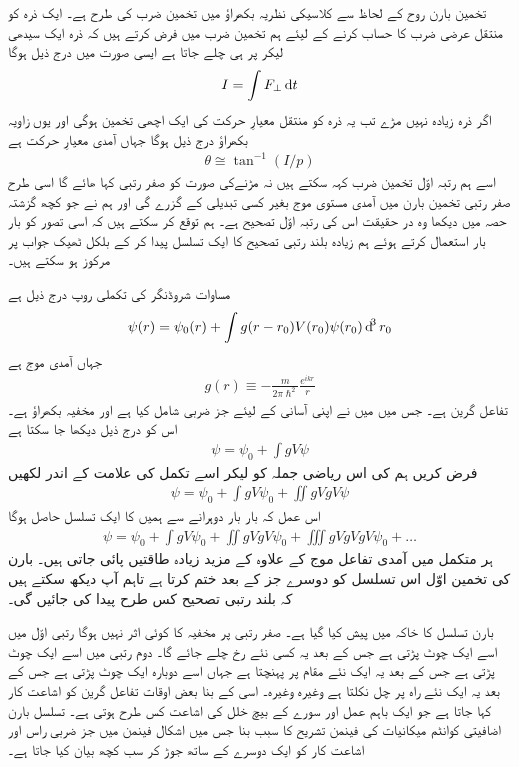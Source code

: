 تخمین بارن روح کے لحاظ سے کلاسیکی نظریہ بکھراؤ میں تخمین ضرب کی طرح ہے۔ ایک ذرہ کو منتقل عرضی ضرب کا حساب کرنے کے لیئے ہم تخمین ضرب میں فرض کرتے ہیں کہ ذرہ ایک سیدھی لیکر پر ہی چلے جاتا ہے  ایسی صورت میں درج ذیل ہوگا
\begin{align}
	I=\int F_\perp\dif t
\end{align}
اگر ذرہ زیادہ نہیں مڑے تب یہ ذرہ کو منتقل معیارِ حرکت کی ایک اچھی تخمین ہوگی اور یوں زاویہ بکھراؤ درج ذیل ہوگا جہاں  آمدی معیارِ حرکت ہے 
\begin{align}
	\theta\cong\tan^{-1}(I/p)
\end{align}
اسے ہم رتبہ اوّل تخمین ضرب کہہ سکتے ہیں نہ مڑنےکی صورت کو صفر رتبی کہا ھائے گا اسی طرح صفر رتبی تخمین بارن میں آمدی مستوی موج بغیر کسی تبدیلی کے گزرے گی اور ہم نے جو کچھ گزشتہ حصہ میں دیکھا وہ در حقیقت اس کی رتبہ اوّل تصحیح ہے۔ ہم توقع کر سکتے ہیں کہ اسی تصور کو بار بار استعمال کرتے ہوئے ہم زیادہ بلند رتبی تصحیح کا ایک تسلسل پیدا کر کے بلکل ٹھیک جواب پر مرکوز ہو سکتے ہیں۔

مساوات شروڈنگر کی تکملی روپ درج ذیل ہے
\begin{align}
	\psi(r)=\psi_0(r)+\int g(r-r_0)V(r_0)\psi(r_0)\dif^3r_0
\end{align}
جہاں  آمدی موج ہے
\begin{align}
	g(r)\equiv-\frac{m}{2\pi\hslash^2}\frac{e^{ikr}}{r}
\end{align}
تفاعل گرین ہے۔ جس میں میں نے اپنی آسانی کے لیئے جز ضربی  شامل کیا ہے اور  مخفیہ بکھراؤ ہے۔ اس کو درج ذیل دیکھا جا سکتا ہے
\begin{align}
	\psi = \psi_0+\int gV\psi
\end{align}
فرض کریں ہم  کی اس ریاضی جملہ کو لیکر اسے تکمل کی علامت کے اندر لکھیں 
\begin{align}
	\psi=\psi_0+\int gV\psi_0+\iint gVgV\psi
\end{align}
اس عمل کہ بار بار دوہرانے سے ہمیں  کا ایک تسلسل حاصل ہوگا
\begin{align}
	\psi=\psi_0+\int gV\psi_0+\iint gVgV\psi_0+\iiint gVgVgV\psi_0+\dots
\end{align}
ہر متکمل میں آمدی تفاعل موج  کے علاوہ  کے مزید زیادہ طاقتیں پائی جاتی ہیں۔ بارن کی تخمین اوّل اس تسلسل کو دوسرے جز کے بعد ختم کرتا ہے تاہم آپ دیکھ سکتے ہیں کہ بلند رتبی تصحیح کس طرح پیدا کی جائیں گی۔

بارن تسلسل کا خاکہ  میں پیش کیا گیا ہے۔ صفر رتبی  پر مخفیہ کا کوئی اثر نہیں ہوگا رتبی اوّل میں اسے ایک چوٹ پڑتی ہے جس کے بعد یہ کسی نئے رخ چلے جائے گا۔ دوم رتبی میں اسے ایک چوٹ پڑتی ہے جس کے بعد یہ ایک نئے مقام پر پہنچتا ہے جہاں اسے دوبارہ ایک چوٹ پڑتی ہے جس کے بعد یہ ایک نئے راہ پر چل نکلتا ہے وغیرہ وغیرہ۔ اسی کے بنا بعض اوقات تفاعل گرین کو اشاعت کار کہا جاتا ہے جو ایک باہم عمل اور سورے کے بیچ خلل کی اشاعت کس طرح ہوتی ہے۔ تسلسل بارن اضافیتی کوانٹم میکانیات کی فینمن تشریح کا سبب بنا جس میں اشکال فینمن میں جز ضربی راس  اور اشاعت کار  کو ایک دوسرے کے ساتھ جوڑ کر سب کچھ بیان کیا جاتا ہے۔


